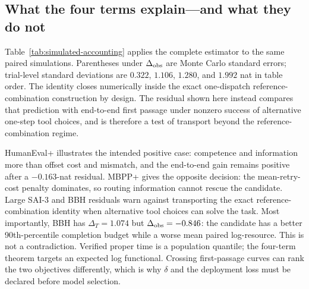 \documentclass{article}
\theoremstyle{definition}
\theoremstyle{plain}
\theoremstyle{remark}
\begin{document}
\subsection{What the four terms explain---and what they do not}

Table~\ref{tab:simulated-accounting} applies the complete estimator to the same
paired simulations.  Parentheses under \(\Delta_{\rm obs}\) are Monte Carlo
standard errors; trial-level standard deviations are \(0.322\), \(1.106\),
\(1.280\), and \(1.992\) nat in table order.  The identity closes numerically
inside the exact one-dispatch reference-combination construction by design.  The
residual shown here instead compares that prediction with end-to-end first
passage under nonzero success of alternative one-step tool choices, and is
therefore a test of transport beyond the reference-combination regime.

\begin{table}[t]
\centering
\caption{Four-term simulation (\(10{,}000\) pairs/dataset; nats).
\(\Delta_{\rm tool}=C+\Phi+G-\varepsilon\),
\(R=\Delta_{\rm obs}-\Delta_{\rm tool}\); positive
speedup favours the candidate.  Standard errors are in parentheses.}
\label{tab:simulated-accounting}
\small
{}
\end{table}

HumanEval+ illustrates the intended positive case: competence and information
more than offset cost and mismatch, and the end-to-end gain remains positive
after a \(-0.163\)-nat residual.  MBPP+ gives the opposite decision: the mean-retry-cost
penalty dominates, so routing information cannot rescue the candidate.  Large
SAI-3 and BBH residuals warn against transporting the exact reference-combination
identity when alternative tool choices can solve the task.  Most importantly, BBH has
\(\Delta_T=1.074\) but \(\Delta_{\rm obs}=-0.846\): the candidate has a better
90th-percentile completion budget while a worse mean paired log-resource.
This is not a contradiction.  Verified proper time is a population quantile;
the four-term theorem targets an expected log functional.  Crossing
first-passage curves can rank the two objectives differently, which is why
\(\delta\) and the deployment loss must be declared before model selection.
\end{document}
